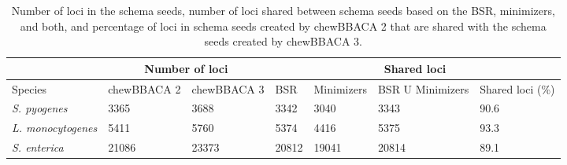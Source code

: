 \begin{table}[h!]
    \caption[Number of loci in the schema seeds, number of loci shared between schema seeds based on the BSR, minimizers, and both, and percentage of loci in schema seeds created by chewBBACA 2 that are shared with the schema seeds created by chewBBACA 3.]{Number of loci in the schema seeds, number of loci shared between schema seeds based on the \ac{BSR}, minimizers, and both, and percentage of loci in schema seeds created by chewBBACA 2 that are shared with the schema seeds created by chewBBACA 3.}
    \label{tab:ch2_tableS2}
    \centering
    \begin{tabular}{@{}lllllll@{}}
    \toprule
    \multicolumn{1}{|c|}{} & \multicolumn{2}{|c|}{Number of loci} & \multicolumn{4}{|c|}{Shared loci} \\ \midrule
    Species & chewBBACA 2 & chewBBACA 3 & BSR & Minimizers & BSR U Minimizers & Shared loci (\%) \\ \midrule
    \textit{S. pyogenes} & 3365 & 3688 & 3342 & 3040 & 3343 & 90.6 \\
    \textit{L. monocytogenes} & 5411 & 5760 & 5374 & 4416 & 5375 & 93.3 \\
    \textit{S. enterica} & 21086 & 23373 & 20812 & 19041 & 20814 & 89.1 \\
    \bottomrule
    \end{tabular}
\end{table}
